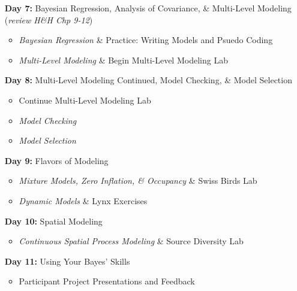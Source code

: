 \documentclass[11pt]{article}
\begin{document}
\begin{enumerate}
\item[\textbf{Day 7:}] Bayesian Regression, Analysis of Covariance, \& Multi-Level Modeling (\emph{review H\&H Chp 9-12})
\begin{itemize}
\item \emph{Bayesian Regression} \& Practice: Writing Models and Psuedo Coding %
\item \emph{Multi-Level Modeling} \& Begin Multi-Level Modeling Lab  %
\end{itemize}


\item[\textbf{Day 8:}] Multi-Level Modeling Continued, Model Checking, \& Model Selection

\begin{itemize}
\item  Continue Multi-Level Modeling Lab %
\item \emph{Model Checking}%
\item \emph{Model Selection}%
\end{itemize}

\item[\textbf{Day 9:}] Flavors of Modeling

\begin{itemize}
\item \emph{Mixture Models, Zero Inflation, \& Occupancy} \& Swiss Birds Lab %
\item \emph{Dynamic Models} \& Lynx Exercises %
\end{itemize}

\newpage

\item[\textbf{Day 10:}] Spatial Modeling

\begin{itemize}
\item \emph{Continuous Spatial Process Modeling} \& Source Diversity Lab%
\end{itemize}

\item[\textbf{Day 11:}] Using Your Bayes' Skills

\begin{itemize}
\item Participant Project Presentations and Feedback 
\end{itemize}

\end{enumerate}
\end{document}

